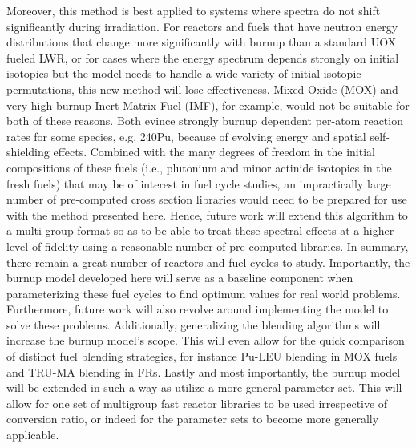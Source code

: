 Moreover, this method is best applied to systems where spectra do not shift significantly during irradiation.  For reactors and fuels that have neutron energy distributions that change more significantly with burnup than a standard UOX fueled LWR, or for cases where the energy spectrum depends strongly on initial isotopics but the model needs to handle a wide variety of initial isotopic permutations, this new method will lose effectiveness.  Mixed Oxide (MOX) and very high burnup Inert Matrix Fuel (IMF), for example, would not be suitable for both of these reasons.  Both evince strongly burnup dependent per-atom reaction rates for some species, e.g. 240Pu, because of evolving energy and spatial self-shielding effects.  Combined with the many degrees of freedom in the initial compositions of these fuels (i.e., plutonium and minor actinide isotopics in the fresh fuels) that may be of interest in fuel cycle studies, an impractically large number of pre-computed cross section libraries would need to be prepared for use with the method presented here.  Hence, future work will extend this algorithm to a multi-group format so as to be able to treat these spectral effects at a higher level of fidelity using a reasonable number of pre-computed libraries.
In summary, there remain a great number of reactors and fuel cycles to study.  Importantly, the burnup model developed here will serve as a baseline component when parameterizing these fuel cycles to find optimum values for real world problems.  Furthermore, future work will also revolve around implementing the model to solve these problems.  Additionally, generalizing the blending algorithms will increase the burnup model’s scope.  This will even allow for the quick comparison of distinct fuel blending strategies, for instance Pu-LEU blending in MOX fuels and TRU-MA blending in FRs.  Lastly and most importantly, the burnup model will be extended in such a way as utilize a more general parameter set.  This will allow for one set of multigroup fast reactor libraries to be used irrespective of conversion ratio, or indeed for the parameter sets to become more generally applicable.
